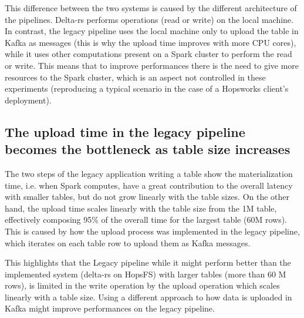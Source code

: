 This difference between the two systems is caused by the different architecture of the pipelines. Delta-rs performs operations (read or write) on the local machine. In contrast, the legacy pipeline uses the local machine only to upload the table in Kafka as messages (this is why the upload time improves with more \gls{CPU} cores), while it uses other computations present on a Spark cluster to perform the read or write. This means that to improve performances there is the need to give more resources to the Spark cluster, which is an aspect not controlled in these experiments (reproducing a typical scenario in the case of a Hopsworks client's deployment). 

\subsection{The upload time in the legacy pipeline becomes the bottleneck as table size increases}

The two steps of the legacy application writing a table show the materialization time, i.e. when Spark computes, have a great contribution to the overall latency with smaller tables, but do not grow linearly with the table sizes. On the other hand, the upload time scales linearly with the table size from the 1M table, effectively composing 95\% of the overall time for the largest table (60M rows). This is caused by how the upload process was implemented in the legacy pipeline, which iterates on each table row to upload them as Kafka messages. 

This highlights that the Legacy pipeline while it might perform better than the implemented system (delta-rs on \gls{HopsFS}) with larger tables (more than 60 M rows), is limited in the write operation by the upload operation which scales linearly with a table size. Using a different approach to how data is uploaded in Kafka might improve performances on the legacy pipeline.